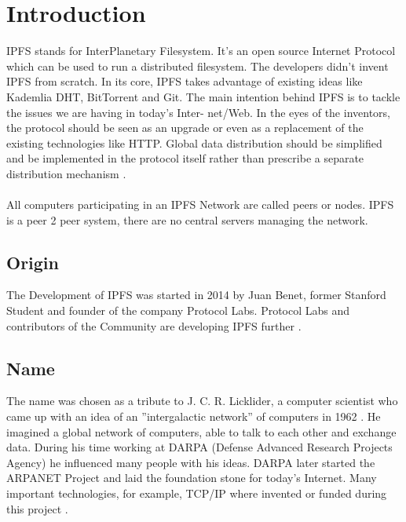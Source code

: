 \documentclass[a4paper,11pt, oneside]{report}
\theoremstyle{definition}
\begin{document}
\chapter{Introduction}
IPFS stands for InterPlanetary Filesystem. It’s an open source Internet Protocol which can be used to run a distributed filesystem. The developers didn’t invent IPFS from scratch. In its core, IPFS takes advantage of existing ideas like Kademlia DHT, BitTorrent and Git. The main intention behind IPFS is to tackle the issues we are having in today's Inter- net/Web. In the eyes of the inventors, the protocol should be seen as an upgrade or even as a replacement of the existing technologies like HTTP. Global data distribution should be simplified and be implemented in the protocol itself rather than prescribe a separate distribution mechanism \cite{IPFSBasics}.\\ \\
All computers participating in an IPFS Network are called peers or nodes. IPFS is a peer 2 peer system, there are no central servers managing the network.

\section{Origin}
The Development of IPFS was started in 2014 by Juan Benet, former Stanford Student and founder of the company Protocol Labs. Protocol Labs and contributors of the Community are developing IPFS further \cite{LinkedIn}.

\section{Name}
The name was chosen as a tribute to J. C. R. Licklider, a computer scientist who came
up with an idea of an ”intergalactic network” of computers in 1962 \cite{Tribute}. He imagined a
global network of computers, able to talk to each other and exchange data. During his
time working at DARPA (Defense Advanced Research Projects Agency) he influenced
many people with his ideas. DARPA later started the ARPANET Project and laid the
foundation stone for today's Internet. Many important technologies, for example, TCP/IP
where invented or funded during this project  \cite{JCR}.

\newpage
\end{document}
